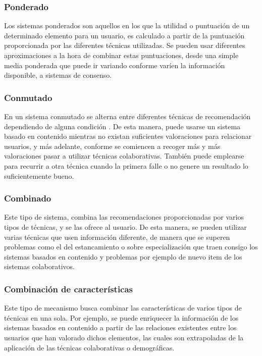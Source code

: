 \subsubsection{Ponderado}
Los sistemas ponderados son aquellos en los que la utilidad o puntuación de un determinado elemento para un usuario, es calculado a partir de la puntuación proporcionada por las diferentes técnicas utilizadas. Se pueden usar diferentes aproximaciones a la hora de combinar estas puntuaciones, desde una simple media ponderada que puede ir variando conforme varíen la información disponible, a sistemas de consenso\cite{Pazzani:1999:FCC:340120.340130}.

\subsubsection{Conmutado}
En un sistema conmutado se alterna entre diferentes técnicas de recomendación dependiendo de alguna condición \cite{tran2000hybrid}. De esta manera, puede usarse un sistema basado en contenido mientras no existan suficientes valoraciones para relacionar usuarios, y más adelante, conforme se comiencen a recoger más y más valoraciones pasar a utilizar técnicas colaborativas. También puede emplearse para recurrir a otra técnica cuando la primera falle o no genere un resultado lo suficientemente bueno.

\subsubsection{Combinado}
Este tipo de sistema, combina las recomendaciones proporcionadas por varios tipos de técnicas, y se las ofrece al usuario\cite{Cotter:2000:PIP:647288.760209}. De esta manera, se pueden utilizar varias técnicas que usen información diferente, de manera que se superen problemas como el del estancamiento o sobre especialización que traen consigo los sistemas basados en contenido y problemas por ejemplo de nuevo item de los sistemas colaborativos.

\subsubsection{Combinación de características}
Este tipo de mecanismo busca combinar las características de varios tipos de técnicas en una sola. Por ejemplo, se puede enriquecer la información de los sistemas basados en contenido a partir de las relaciones existentes entre los usuarios que han valorado dichos elementos, las cuales son extrapoladas de la aplicación de las técnicas colaborativas o demográficas.

